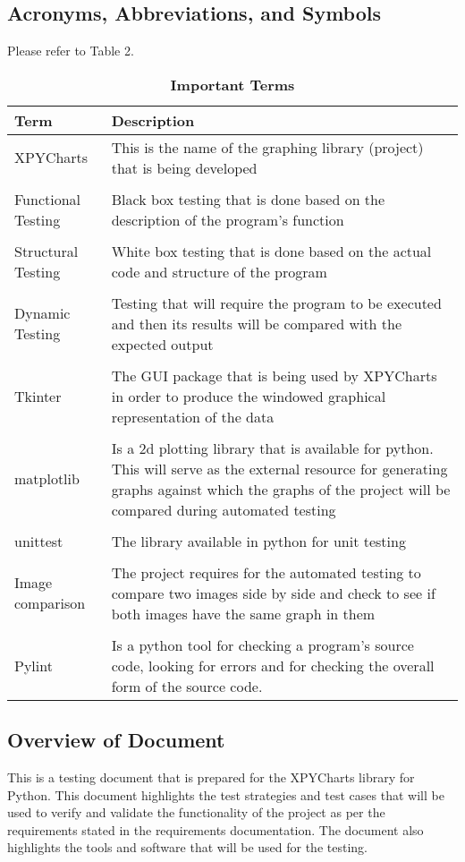 \documentclass[12pt, titlepage]{article}
\begin{document}
\subsection{Acronyms, Abbreviations, and Symbols}
Please refer to Table 2.
\begin{table}[hbp]
\caption{\textbf{Important Terms}} \label{Table}
\begin{tabularx}{\textwidth}{p{5cm}X}
\toprule
\textbf{Term} & \textbf{Description} \\
\midrule
XPYCharts & This is the name of the graphing library (project) that is being developed \\
\\
Functional Testing & Black box testing that is done based on the description of the program’s function\\
\\
Structural Testing & White box testing that is done based on the actual code and structure of the program\\
\\
Dynamic Testing & Testing that will require the program to be executed and then its results will be compared with the expected output\\
\\
Tkinter  & The GUI package that is being used by XPYCharts in order to produce the windowed graphical representation of the data\\
\\
matplotlib & Is a 2d plotting library that is available for python. This will serve as the external resource for generating graphs against which the graphs of the project will be compared during automated testing\\
\\
unittest & The library available in python for unit testing\\
\\
Image comparison & The project requires for the automated testing to compare two images side by side and check to see if both images have the same graph in them\\
\\
Pylint & Is a python tool for checking a program’s source code, looking for errors and for checking the overall form of the source code.\\

\bottomrule
\end{tabularx}
\end{table}	
\subsection{Overview of Document}
This is a testing document that is prepared for the XPYCharts library for Python. This document highlights the test strategies and test cases that will be used to verify and validate the functionality of the project as per the requirements stated in the requirements documentation. The document also highlights the tools and software that will be used for the testing. 
\end{document}

